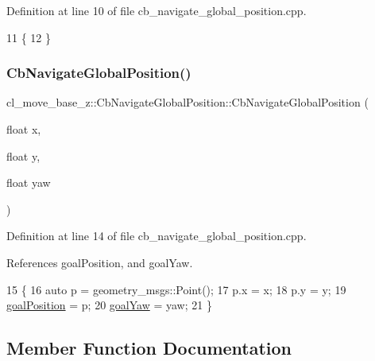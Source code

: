 Definition at line 10 of file cb\+\_\+navigate\+\_\+global\+\_\+position.\+cpp.


\begin{DoxyCode}
11 \{
12 \}
\end{DoxyCode}
\mbox{\label{classcl__move__base__z_1_1CbNavigateGlobalPosition_a79d42c0eeee48af5e73d917fa2d5b4f5}} 
\subsubsection{\texorpdfstring{Cb\+Navigate\+Global\+Position()}{CbNavigateGlobalPosition()}\hspace{0.1cm}{\footnotesize\ttfamily [2/2]}}
{\footnotesize\ttfamily cl\+\_\+move\+\_\+base\+\_\+z\+::\+Cb\+Navigate\+Global\+Position\+::\+Cb\+Navigate\+Global\+Position (\begin{DoxyParamCaption}\item[{float}]{x,  }\item[{float}]{y,  }\item[{float}]{yaw }\end{DoxyParamCaption})}



Definition at line 14 of file cb\+\_\+navigate\+\_\+global\+\_\+position.\+cpp.



References goal\+Position, and goal\+Yaw.


\begin{DoxyCode}
15 \{
16   \textcolor{keyword}{auto} p = geometry\_msgs::Point();
17   p.x = x;
18   p.y = y;
19   \hyperlink{classcl__move__base__z_1_1CbNavigateGlobalPosition_a51a0266fd9a63e99f26e88933529c559}{goalPosition} = p;
20   \hyperlink{classcl__move__base__z_1_1CbNavigateGlobalPosition_a839900de7f664b27c9be189fadbaa003}{goalYaw} = yaw;
21 \}
\end{DoxyCode}


\subsection{Member Function Documentation}
\mbox{\label{classcl__move__base__z_1_1CbNavigateGlobalPosition_a0b8525ea9e4388b27cb1f9b1e06a3b63}} 
